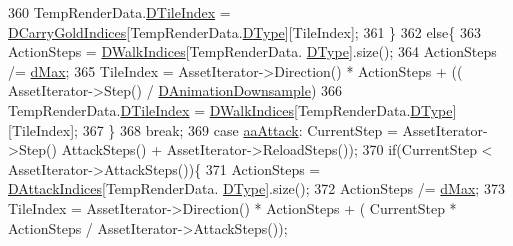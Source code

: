 \begin{DoxyCode}
{360                                                 TempRenderData.\hyperlink{structSAssetRenderData_a8c97c7f34d5b359f6fa23ce215a09929}{DTileIndex} = 
      \hyperlink{classCAssetRenderer_aaf8c772b7d3fbe8c145282e5106749d6}{DCarryGoldIndices}[TempRenderData.\hyperlink{structSAssetRenderData_ae986cfe9d4238fa31fb511b40392d97f}{DType}][TileIndex];  
361                                             \}
362                                             \textcolor{keywordflow}{else}\{
363                                                 ActionSteps = \hyperlink{classCAssetRenderer_a9975fd583c826c9905ccd080659bd3c5}{DWalkIndices}[TempRenderData.
      \hyperlink{structSAssetRenderData_ae986cfe9d4238fa31fb511b40392d97f}{DType}].size();
364                                                 ActionSteps /= \hyperlink{GameDataTypes_8h_acb2b033915f6659a71a38b5aa6e4eb42af6546049275557ce0ade2ceee042a319}{dMax};
365                                                 TileIndex = AssetIterator->Direction() * ActionSteps + ((
      AssetIterator->Step() / \hyperlink{classCAssetRenderer_a13ea9a19837c39e57db499f53366c5b8}{DAnimationDownsample})%
366                                                 TempRenderData.\hyperlink{structSAssetRenderData_a8c97c7f34d5b359f6fa23ce215a09929}{DTileIndex} = 
      \hyperlink{classCAssetRenderer_a9975fd583c826c9905ccd080659bd3c5}{DWalkIndices}[TempRenderData.\hyperlink{structSAssetRenderData_ae986cfe9d4238fa31fb511b40392d97f}{DType}][TileIndex];
367                                             \}   
368                                             \textcolor{keywordflow}{break};
369                     \textcolor{keywordflow}{case} \hyperlink{GameDataTypes_8h_ab47668e651a3032cfb9c40ea2d60d670a948eefd20b9e43d3b4cfcf613774716d}{aaAttack}:          CurrentStep = AssetIterator->Step() %
      AttackSteps() + AssetIterator->ReloadSteps());
370                                             \textcolor{keywordflow}{if}(CurrentStep < AssetIterator->AttackSteps())\{
371                                                 ActionSteps = \hyperlink{classCAssetRenderer_acc2d0fab5a9f1f35a1d5eaf28ff743cc}{DAttackIndices}[TempRenderData.
      \hyperlink{structSAssetRenderData_ae986cfe9d4238fa31fb511b40392d97f}{DType}].size();
372                                                 ActionSteps /= \hyperlink{GameDataTypes_8h_acb2b033915f6659a71a38b5aa6e4eb42af6546049275557ce0ade2ceee042a319}{dMax};
373                                                 TileIndex = AssetIterator->Direction() * ActionSteps + (
      CurrentStep * ActionSteps / AssetIterator->AttackSteps());
}
\end{DoxyCode}
